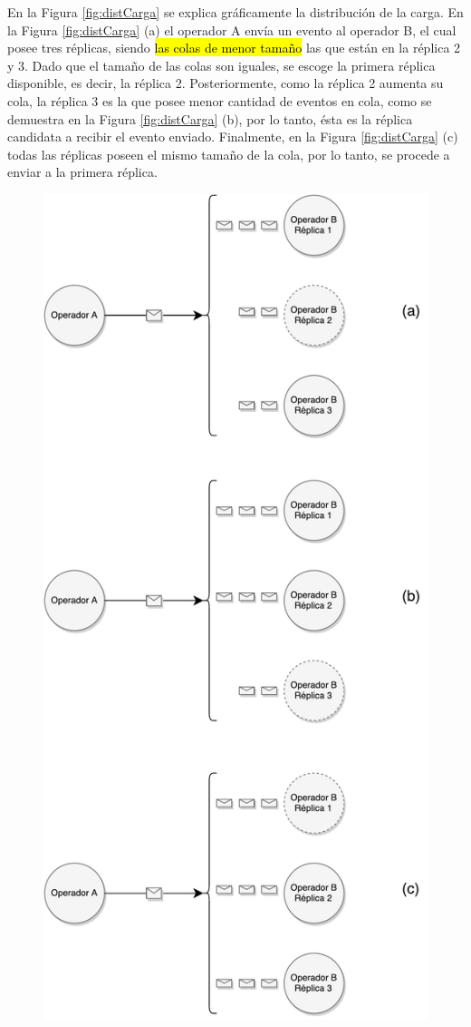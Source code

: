 En la Figura \ref{fig:distCarga} se explica gráficamente la distribución de la carga. En la Figura \ref{fig:distCarga} (a) el operador A envía un evento al operador B, el cual posee tres réplicas, siendo \hl{las colas de menor tamaño} las que están en la réplica 2 y 3. Dado que el tamaño de las colas son iguales, se escoge la primera réplica disponible, es decir, la réplica 2. Posteriormente, como la réplica 2 aumenta su cola, la réplica 3 es la que posee menor cantidad de eventos en cola, como se demuestra en la Figura \ref{fig:distCarga} (b), por lo tanto, ésta es la réplica candidata a recibir el evento enviado. Finalmente, en la Figura \ref{fig:distCarga} (c) todas las réplicas poseen el mismo tamaño de la cola, por lo tanto, se procede a enviar a la primera réplica.

\begin{figure}[!ht]
	\centering
		\includegraphics[scale=0.4]{images/DistribucionCarga.pdf}

\end{figure}
